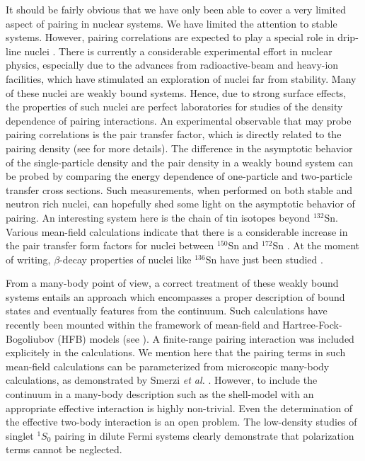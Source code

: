 \documentclass[rmp,aps,floatfix]{revtex4}
\begin{document}
It should be fairly obvious that we have only been able to cover
a very limited aspect of pairing in nuclear systems.
We have limited the attention to stable systems. However, 
pairing correlations are expected to play a special role
in drip-line nuclei \cite{dob_96}. There is currently a considerable
experimental effort in nuclear physics, especially due to the 
advances from radioactive-beam and heavy-ion 
facilities, which  have stimulated an exploration of 
nuclei far from stability. Many of these nuclei are weakly bound systems.
Hence, due to strong surface effects, the properties of such nuclei
are perfect laboratories for studies of the density dependence of 
pairing interactions. An experimental observable that may probe
pairing correlations is the pair transfer factor, which is directly related 
to the pairing density (see \cite{jacekwitek1998} for more details). 
The difference in the asymptotic behavior of 
the single-particle density and the pair density in a weakly bound system can 
be probed by comparing the energy dependence 
of one-particle and two-particle transfer cross sections.
Such measurements, when performed on both stable and neutron rich nuclei,
can hopefully shed some light on the asymptotic behavior of pairing. 
An interesting system here is the chain of tin isotopes beyond $^{132}$Sn.
Various mean-field calculations \cite{dob_96} indicate that there is a
considerable increase in the pair transfer form factors for nuclei 
between  $^{150}$Sn and  $^{172}$Sn \cite{dob_96}. At the moment of writing,
$\beta$-decay properties of nuclei like  $^{136}$Sn have just been studied
\cite{shergur2002}. 
 
From a many-body point of view, a 
correct treatment of these weakly bound systems
entails an approach which encompasses a proper description of bound states and eventually features from the continuum. Such calculations have recently been mounted within the framework of mean-field and Hartree-Fock-Bogoliubov (HFB) 
models (see \cite{sandulescu2001,sandulescu2002}). A 
finite-range pairing 
interaction was included explicitely in the calculations. 
We mention here that the pairing terms in such mean-field calculations
can be parameterized from microscopic many-body calculations, as demonstrated
by Smerzi {\em et al.} \cite{smerzi1997}.
However, 
to include
the continuum in a many-body description such as the shell-model with an
appropriate effective interaction is highly non-trivial. Even the determination
of the effective two-body interaction is an open problem. The low-density
studies of singlet $^1S_0$ pairing in dilute Fermi systems \cite{henning2000}
clearly demonstrate that polarization terms cannot be neglected. 
\end{document}
